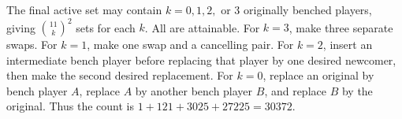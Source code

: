 The final active set may contain $k=0,1,2,$ or $3$ originally benched players, giving $\binom{11}{k}^2$ sets for each $k$. All are attainable. For $k=3$, make three separate swaps. For $k=1$, make one swap and a cancelling pair. For $k=2$, insert an intermediate bench player before replacing that player by one desired newcomer, then make the second desired replacement. For $k=0$, replace an original by bench player $A$, replace $A$ by another bench player $B$, and replace $B$ by the original. Thus the count is $1+121+3025+27225=\boxed{30372}$.
